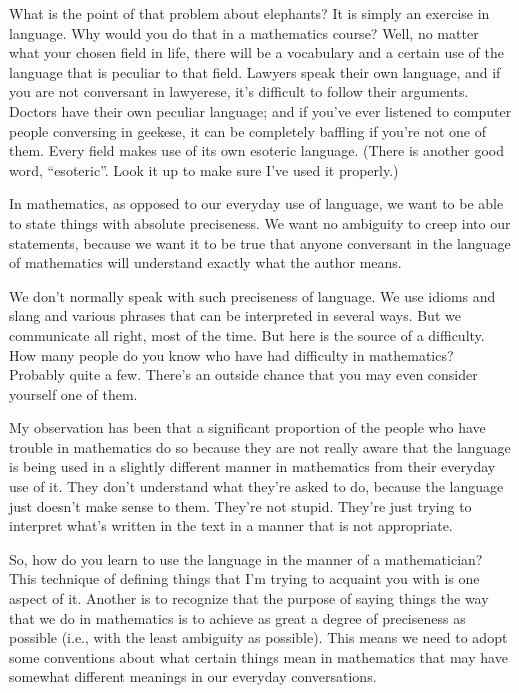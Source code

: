 \documentclass[english]{book}
\begin{document}
What is the point of that problem about elephants? It is simply an exercise in language. Why would you do that in a mathematics course? Well, no matter what your chosen field in life, there will be a vocabulary and a certain use of the language that is peculiar to that field. Lawyers speak their own language, and if you are not conversant in lawyerese, it's difficult to follow their arguments. Doctors have their own peculiar language; and if you've ever listened to computer people conversing in geekese, it can be completely baffling if you're not one of them. Every field makes use of its own esoteric language. (There is another good word, ``esoteric''. Look it up to make sure I've used it properly.)

In mathematics, as opposed to our everyday use of language, we want to be able to state things with absolute preciseness. We want no ambiguity to creep into our statements, because we want it to be true that anyone conversant in the language of mathematics will understand exactly what the author means.

We don't normally speak with such preciseness of language. We use idioms and slang and various phrases that can be interpreted in several ways. But we communicate all right, most of the time. But here is the source of a difficulty. How many people do you know who have had difficulty in mathematics? Probably quite a few. There's an outside chance that you may even consider yourself one of them. 

My observation has been that a significant proportion of the people who have trouble in mathematics do so because they are not really aware that the language is being used in a slightly different manner in mathematics from their everyday use of it. They don't understand what they're asked to do, because the language just doesn't make sense to them. They're not stupid. They're just trying to interpret what's written in the text in a manner that is not appropriate. 

So, how do you learn to use the language in the manner of a mathematician? This technique of defining things that I'm trying to acquaint you with is one aspect of it. Another is to recognize that the purpose of saying things the way that we do in mathematics is to achieve as great a degree of preciseness as possible (i.e., with the least ambiguity as possible). This means we need to adopt some conventions about what certain things mean in mathematics that may have somewhat different meanings in our everyday conversations.
\end{document}
